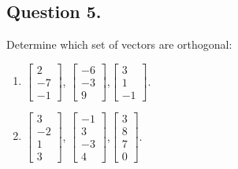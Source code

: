 \documentclass{article}
\begin{document}
\subsection*{Question 5.}
Determine which set of vectors are orthogonal:
\begin{enumerate}[label=(\arabic*)]
    \item $\left[\begin{array}{r}2\\-7\\-1\end{array}\right]$, $\left[\begin{array}{r}-6\\-3\\9\end{array}\right]$,$\left[\begin{array}{r}3\\1\\-1\end{array}\right]$.
    \item $\left[\begin{array}{r}3\\-2\\1\\3\end{array}\right]$, $\left[\begin{array}{r}-1\\3\\-3\\4\end{array}\right]$,$\left[\begin{array}{r}3\\8\\7\\0\end{array}\right]$.
\end{enumerate}
\end{document}
